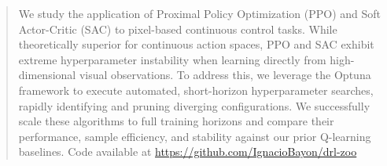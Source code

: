 \documentclass{article}
\begin{document}
\setlength{\textfloatsep}{0.15in}

\printAffiliationsAndNotice{}

\begin{abstract}
We study the application of Proximal Policy Optimization (PPO) and Soft Actor-Critic (SAC) to pixel-based continuous control tasks. While theoretically superior for continuous action spaces, PPO and SAC exhibit extreme hyperparameter instability when learning directly from high-dimensional visual observations. To address this, we leverage the Optuna framework to execute automated, short-horizon hyperparameter searches, rapidly identifying and pruning diverging configurations. We successfully scale these algorithms to full training horizons and compare their performance, sample efficiency, and stability against our prior Q-learning baselines.
Code available at \url{https://github.com/IgnacioBayon/drl-zoo}
\end{abstract}










\end{document}
